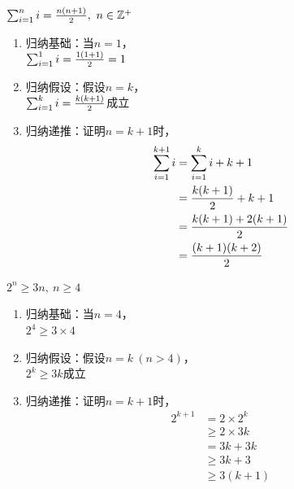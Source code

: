 \documentclass[12pt, openany, oneside]{book}
\begin{document}
\begin{tcolorbox}
	$ \sum_{i=1}^{n} i = {n(n+1) \over 2},\ n \in \mathbb{Z^+} $
	\begin{enumerate}
		\item 归纳基础：当$ n = 1 $，\\
		      $ \sum_{i=1}^{1} i = {1(1+1) \over 2} = 1 $

		\item 归纳假设：假设$ n = k $，\\
		      $ \sum_{i=1}^{k} i = {k(k+1) \over 2} $成立

		\item 归纳递推：证明$ n = k + 1 $时，
		      \begin{align*}
			      \sum_{i=1}^{k+1} i & = \sum_{i=1}^{k} i + k + 1  \\
			                         & = {k(k+1) \over 2} + k + 1  \\
			                         & = {k(k+1) + 2(k+1) \over 2} \\
			                         & = {(k+1)(k+2) \over 2}
		      \end{align*}
	\end{enumerate}
\end{tcolorbox}

\begin{tcolorbox}
	$ 2^n \ge 3n,\ n \ge 4 $
	\begin{enumerate}
		\item 归纳基础：当$ n = 4 $，\\
		      $ 2^4 \ge 3 \times 4 $

		\item 归纳假设：假设$ n = k\ (n > 4) $，\\
		      $ 2^k \ge 3k $成立

		\item 归纳递推：证明$ n = k + 1 $时，
		      \begin{align*}
			      2^{k+1} & = 2 \times 2^k  \\
			              & \ge 2 \times 3k \\
			              & = 3k + 3k       \\
			              & \ge 3k + 3      \\
			              & \ge 3(k+1)
		      \end{align*}
	\end{enumerate}
\end{tcolorbox}
\end{document}
